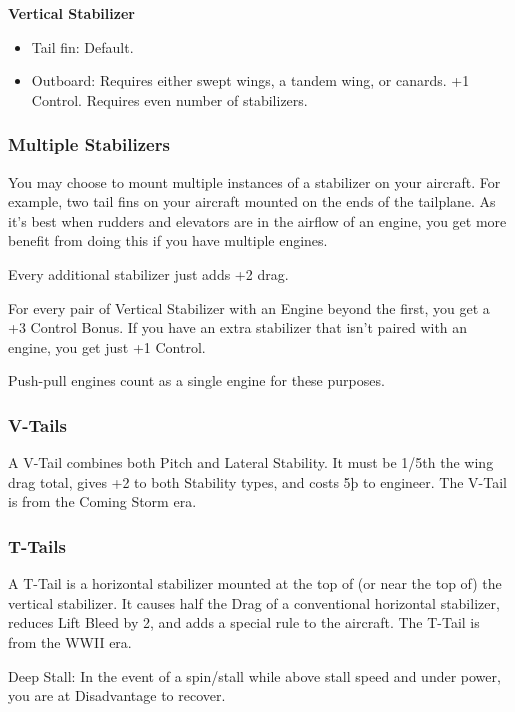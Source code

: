 \documentclass{article}
\begin{document}
\textbf{Vertical Stabilizer}

\begin{itemize}
    \item          Tail fin: Default.
    \item          Outboard: Requires either swept wings, a tandem wing, or
          canards. +1 Control. Requires even number of stabilizers.
\end{itemize}

\subsubsection{Multiple Stabilizers}
\label{_Multiple Stabilizers}

You may choose to mount multiple instances of a stabilizer on your
aircraft. For example, two tail fins on your aircraft mounted on the
ends of the tailplane. As it's best when rudders and elevators are in
the airflow of an engine, you get more benefit from doing this if you
have multiple engines.

Every additional stabilizer just adds +2 drag.

For every pair of Vertical Stabilizer with an Engine beyond the first,
you get a +3 Control Bonus. If you have an extra stabilizer that isn't
paired with an engine, you get just +1 Control.

Push-pull engines count as a single engine for these purposes.

\subsubsection{V-Tails}
\label{_V-Tails}

A V-Tail combines both Pitch and Lateral Stability. It must be 1/5th the
wing drag total, gives +2 to both Stability types, and costs 5þ to
engineer. The V-Tail is from the Coming Storm era.

\subsubsection{T-Tails}
\label{_T-Tails}

A T-Tail is a horizontal stabilizer mounted at the top of (or near the
top of) the vertical stabilizer. It causes half the Drag of a
conventional horizontal stabilizer, reduces Lift Bleed by 2, and adds a
special rule to the aircraft. The T-Tail is from the WWII era.

Deep Stall: In the event of a spin/stall while above stall speed and
under power, you are at Disadvantage to recover.
\end{document}
